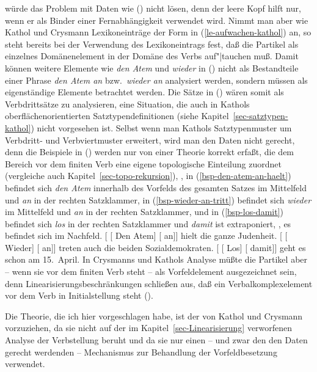 würde das Problem mit Daten wie () nicht lösen, denn der leere Kopf hilft nur,
wenn er als Binder einer Fernabhängigkeit verwendet wird. Nimmt man aber wie Kathol und Crysmann
Lexikoneinträge der Form in (\ref{le-aufwachen-kathol}) an, so steht bereits bei der Verwendung
des Lexikoneintrags fest, daß die Partikel als einzelnes Domänenelement in der Domäne des Verbs auf"|tauchen muß.
Damit können weitere Elemente wie \emph{den Atem} und \emph{wieder} in () nicht als
Bestandteile einer Phrase \emph{den Atem an} bzw.\ \emph{wieder an} analysiert werden, sondern
müssen als eigenständige Elemente betrachtet werden. Die Sätze in () wären somit als
Verbdrittsätze zu analysieren, eine Situation, die auch in Kathols oberflächenorientierten
Satztypendefinitionen (siehe Kapitel~\ref{sec-satztypen-kathol}) nicht vorgesehen ist. Selbst wenn man Kathols
Satztypenmuster um Verbdritt- und Verbviertmuster erweitert, wird man den Daten nicht gerecht, denn
die Beispiele in () werden nur von einer Theorie korrekt erfaßt, die dem Bereich
vor dem finiten Verb eine eigene topologische Einteilung zuordnet (vergleiche auch Kapitel~\ref{sec-topo-rekursion}),
\dash, in (\ref{bsp-den-atem-an-haelt}) befindet sich \emph{den Atem} innerhalb des Vorfelds
des gesamten Satzes im Mittelfeld und \emph{an} in der rechten Satzklammer,
in (\ref{bsp-wieder-an-tritt}) befindet sich \emph{wieder} im Mittelfeld und \emph{an} in der rechten Satzklammer,
und in (\ref{bsp-los-damit}) befindet sich \emph{los} in der rechten Satzklammer und \emph{damit}
ist extraponiert, \dash, es befindet sich im Nachfeld.
\eal
\label{bsp-partikel+anderes+material-topo-felder}
\ex\label{bsp-den-atem-an-haelt-zwei}
{}[ [ Den Atem] [ an]] hielt die ganze Judenheit.
\ex\label{bsp-wieder-an-tritt-zwei}
{}[ [ Wieder] [ an]] treten auch die beiden Sozialdemokraten.
\ex\label{bsp-los-damit-zwei}
{}[ [ Los] [ damit]] geht es schon am 15.\ April.
\zl
In Crysmanns und Kathols Analyse müßte die Partikel aber -- wenn sie vor dem finiten Verb
steht -- als Vorfeldelement ausgezeichnet sein, denn Linearisierungsbeschränkungen schließen
aus, daß ein Verbalkomplexelement vor dem Verb in Initialstellung steht (\citealp[]{Crysmann2002a}).%

Die Theorie, die ich hier vorgeschlagen habe, ist der von Kathol und Crysmann vorzuziehen,
da sie nicht auf der im Kapitel~\ref{sec-Linearisierung} verworfenen Analyse der Verbstellung 
beruht und da sie nur einen -- und zwar den den Daten gerecht werdenden -- 
Mechanismus zur Behandlung der Vorfeldbesetzung verwendet.

